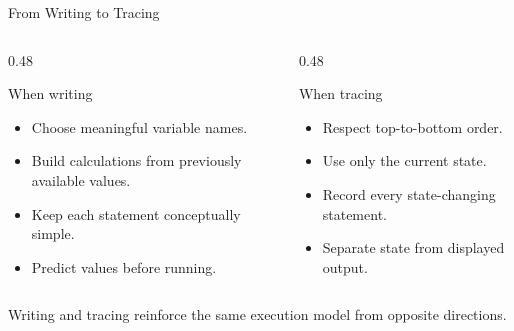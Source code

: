 \documentclass[aspectratio=169,10pt]{beamer}
\begin{document}
\begin{frame}{From Writing to Tracing}
  \begin{columns}[T,onlytextwidth]
    \begin{column}{0.48\textwidth}
      \begin{block}{When writing}
        \begin{itemize}
          \item Choose meaningful variable names.
          \item Build calculations from previously available values.
          \item Keep each statement conceptually simple.
          \item Predict values before running.
        \end{itemize}
      \end{block}
    \end{column}

    \begin{column}{0.48\textwidth}
      \begin{block}{When tracing}
        \begin{itemize}
          \item Respect top-to-bottom order.
          \item Use only the current state.
          \item Record every state-changing statement.
          \item Separate state from displayed output.
        \end{itemize}
      \end{block}
    \end{column}
  \end{columns}

  \begin{keyidea}
    Writing and tracing reinforce the same execution model from opposite directions.
  \end{keyidea}
\end{frame}
\end{document}
